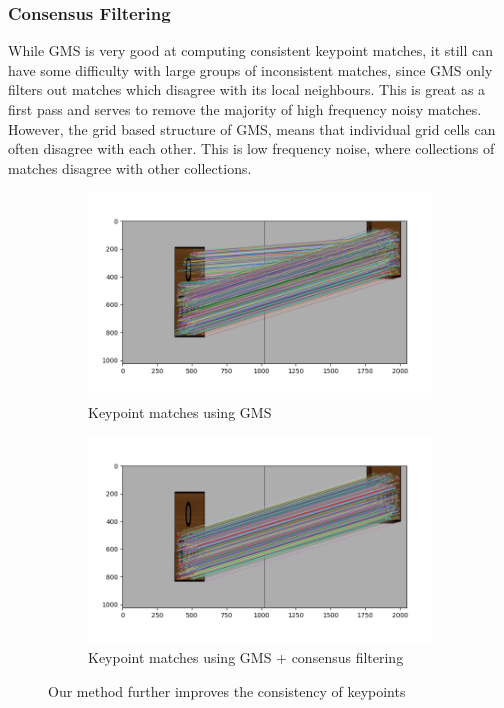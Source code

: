 \subsubsection{Consensus Filtering}
While GMS is very good at computing consistent keypoint matches, it still can have some difficulty with large groups of inconsistent matches, since GMS only filters out matches which disagree with its local neighbours. This is great as a first pass and serves to remove the majority of high frequency noisy matches. However, the grid based structure of GMS, means that individual grid cells can often disagree with each other. This is low frequency noise, where collections of matches disagree with other collections.\\

\begin{figure}[h]
    \centering
    \begin{subfigure}[t]{0.49\textwidth}
        \includegraphics[width=\textwidth]{figures/outliers-gms.png}
        \caption{Keypoint matches using GMS}
        \label{fig:outliers-gms}
    \end{subfigure}
    \hfill
    \begin{subfigure}[t]{0.49\textwidth}
        \includegraphics[width=\textwidth]{figures/outliers-gms+ours.png}
        \caption{Keypoint matches using GMS + consensus filtering}
        \label{fig:outliers-gms+filter}
    \end{subfigure}
    \caption{Our method further improves the consistency of keypoints}
    \label{fig:consensus-filtering}
\end{figure}

